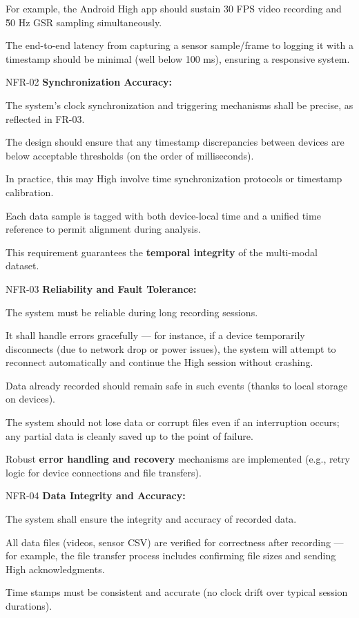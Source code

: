 For example, the Android High app should sustain 30 FPS video recording and \~50
Hz GSR sampling simultaneously.

The end-to-end latency from capturing a sensor sample/frame to logging it with a
timestamp should be minimal (well below 100 ms), ensuring a responsive system.

NFR-02 \textbf{Synchronization Accuracy:}

The system's clock synchronization and triggering mechanisms shall be precise,
as reflected in FR-03.

The design should ensure that any timestamp discrepancies between devices are
below acceptable thresholds (on the order of milliseconds).

In practice, this may High involve time synchronization protocols or timestamp
calibration.

Each data sample is tagged with both device-local time and a unified time
reference to permit alignment during analysis.

This requirement guarantees the \textbf{temporal integrity}
 of the multi-modal dataset.

NFR-03 \textbf{Reliability and Fault Tolerance:}

The system must be reliable during long recording sessions.

It shall handle errors gracefully --- for instance, if a device temporarily
disconnects (due to network drop or power issues), the system will attempt to
reconnect automatically and continue the High session without crashing.

Data already recorded should remain safe in such events (thanks to local storage
on devices).

The system should not lose data or corrupt files even if an interruption occurs;
any partial data is cleanly saved up to the point of failure.

Robust \textbf{error handling and recovery}
mechanisms are implemented (e.g., retry logic for device connections and file
transfers).

NFR-04 \textbf{Data Integrity and Accuracy:}

The system shall ensure the integrity and accuracy of recorded data.

All data files (videos, sensor CSV) are verified for correctness after recording
--- for example, the file transfer process includes confirming file sizes and
sending High acknowledgments.

Time stamps must be consistent and accurate (no clock drift over typical session
durations).

